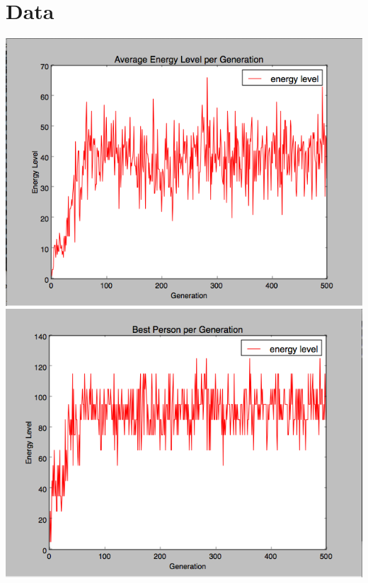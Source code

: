 \documentclass{article}
\begin{document}
 

\section{Data}

\includegraphics[width=1.25\textwidth]{average_energy}
\includegraphics[width=1\textwidth]{best_person}
\end{document}
